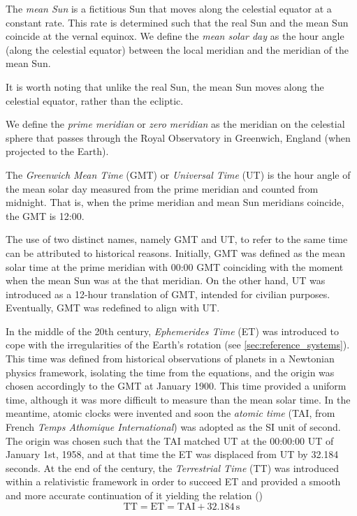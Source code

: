 \documentclass[../main.tex]{subfiles}
\begin{document}
\begin{definition}
  The \emph{mean Sun} is a fictitious Sun that moves along the celestial equator at a constant rate. This rate is determined such that the real Sun and the mean Sun coincide at the vernal equinox. We define the \emph{mean solar day} as the hour angle (along the celestial equator) between the local meridian and the meridian of the mean Sun.
\end{definition}
It is worth noting that unlike the real Sun, the mean Sun moves along the celestial equator, rather than the ecliptic.
\begin{definition}
  We define the \emph{prime meridian} or \emph{zero meridian} as the meridian on the celestial sphere that passes through the Royal Observatory in Greenwich, England (when projected to the Earth).
\end{definition}
\begin{definition}
  The \emph{Greenwich Mean Time} (GMT) or \emph{Universal Time} (UT) is the hour angle of the mean solar day measured from the prime meridian and counted from midnight. That is, when the prime meridian and mean Sun meridians coincide, the GMT is 12:00.
\end{definition}
The use of two distinct names, namely GMT and UT, to refer to the same time can be attributed to historical reasons. Initially, GMT was defined as the mean solar time at the prime meridian with 00:00 GMT coinciding with the moment when the mean Sun was at the that meridian. On the other hand, UT was introduced as a 12-hour translation of GMT, intended for civilian purposes. Eventually, GMT was redefined to align with UT.

In the middle of the 20th century, \emph{Ephemerides Time} (ET) was introduced to cope with the irregularities of the Earth's rotation (see \cref{sec:reference_systems}). This time was defined from historical observations of planets in a Newtonian physics framework, isolating the time from the equations, and the origin was chosen accordingly to the GMT at January 1900. This time provided a uniform time, although it was more difficult to measure than the mean solar time. In the meantime, atomic clocks were invented and soon the \emph{atomic time} (TAI, from French \emph{Temps Athomique International}) was adopted as the SI unit of second. The origin was chosen such that the TAI matched UT at the 00:00:00 UT of January 1st, 1958, and at that time the ET was displaced from UT by 32.184 seconds. At the end of the century, the \emph{Terrestrial Time} (TT) was introduced within a relativistic framework in order to succeed ET and provided a smooth and more accurate continuation of it yielding the relation (\cite{montenbruck})
\begin{equation}
  \text{TT}=\text{ET}= \text{TAI} + 32.184\,\mathrm{s}
\end{equation}
\end{document}
